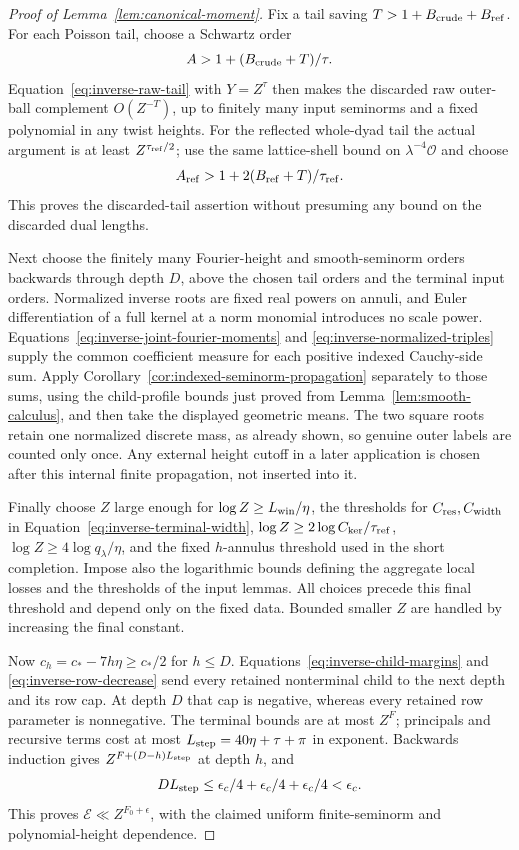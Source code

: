 \documentclass[11pt,a4paper]{article}
\numberwithin{equation}{section}
\numberwithin{figure}{section}
\theoremstyle{definition}
\theoremstyle{remark}
\begin{document}
\begin{proof}[Proof of Lemma~\ref{lem:canonical-moment}]
Fix a tail saving \(T>1+B_{\rm crude}+B_{\rm ref}\).  For each Poisson
tail, choose a Schwartz order
\[
 A>1+(B_{\rm crude}+T)/\tau.
\]
Equation~\eqref{eq:inverse-raw-tail} with \(Y=Z^\tau\) then makes the
discarded raw outer-ball complement \(O(Z^{-T})\), up to finitely many
input seminorms and a fixed polynomial in any twist heights.  For the
reflected whole-dyad tail the actual argument is at least
\(Z^{\tau_{\rm ref}/2}\); use the same lattice-shell bound on
\(\lambda^{-4}\mathcal O\) and choose
\[
 A_{\rm ref}>1+2(B_{\rm ref}+T)/\tau_{\rm ref}.
\]
This proves the discarded-tail assertion without presuming any bound on
the discarded dual lengths.

Next choose the finitely many Fourier-height and smooth-seminorm orders
backwards through depth \(D\), above the chosen tail orders and the
terminal input orders.  Normalized inverse roots are fixed real powers
on annuli, and Euler differentiation of a full kernel at a norm monomial
introduces no scale power.  Equations~\eqref{eq:inverse-joint-fourier-moments}
and \eqref{eq:inverse-normalized-triples} supply the common coefficient
measure for each positive indexed Cauchy-side sum.  Apply
Corollary~\ref{cor:indexed-seminorm-propagation} separately to those sums,
using the child-profile bounds just proved from
Lemma~\ref{lem:smooth-calculus}, and then take the displayed geometric
means.  The two square roots retain one normalized discrete mass, as
already shown, so genuine outer labels are counted only once.
Any external height cutoff in a later application
is chosen after this internal finite propagation, not inserted into it.

Finally choose \(Z\) large enough for \(\log Z\ge L_{\rm win}/\eta\),
the thresholds for \(C_{\rm res},C_{\rm width}\) in
Equation~\eqref{eq:inverse-terminal-width},
\(\log Z\ge2\log C_{\rm ker}/\tau_{\rm ref}\),
\(\log Z\ge4\log q_\lambda/\eta\), and the fixed \(h\)-annulus threshold
used in the short completion.  Impose also the logarithmic bounds defining
the aggregate local losses and the thresholds of the input lemmas.
All choices precede this final threshold and depend only on the fixed
data.  Bounded smaller \(Z\) are handled by increasing the final constant.

Now \(c_h=c_*-7h\eta\ge c_*/2\) for \(h\le D\).
Equations~\eqref{eq:inverse-child-margins} and
\eqref{eq:inverse-row-decrease} send every retained nonterminal child to
the next depth and its row cap.  At depth \(D\) that cap is negative,
whereas every retained row parameter is nonnegative.  The terminal bounds
are at most \(Z^F\); principals and recursive terms cost at most
\(L_{\rm step}=40\eta+\tau+\pi\) in exponent.  Backwards induction gives
\(Z^{F+(D-h)L_{\rm step}}\) at depth \(h\), and
\[
 D L_{\rm step}\le\epsilon_c/4+\epsilon_c/4+\epsilon_c/4<\epsilon_c.
\]
This proves \(\mathcal E\ll Z^{F_0+\epsilon}\), with the claimed
uniform finite-seminorm and polynomial-height dependence.
\end{proof}
\end{document}
